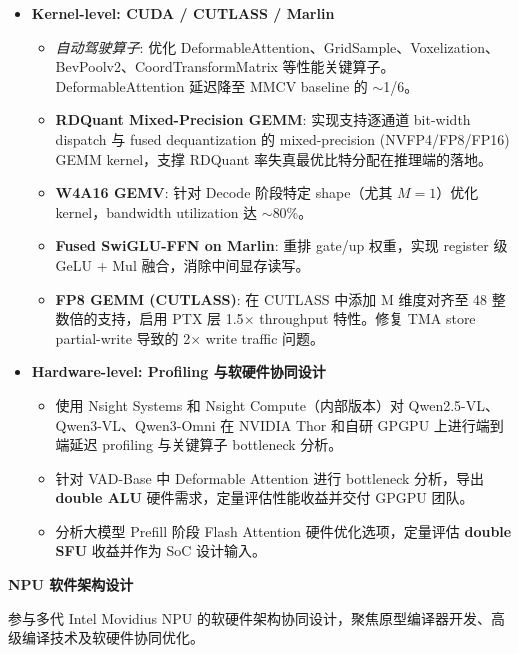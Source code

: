 \documentclass{resume_zh}
\begin{document}
\begin{itemize}
\item \textbf{Kernel-level: CUDA / CUTLASS / Marlin}
\begin{itemize}
  \item \textit{自动驾驶算子}: 优化 DeformableAttention、GridSample、Voxelization、BevPoolv2、CoordTransformMatrix 等性能关键算子。DeformableAttention 延迟降至 MMCV baseline 的 $\sim$1/6。
  \item \textbf{RDQuant Mixed-Precision GEMM}: 实现支持逐通道 bit-width dispatch 与 fused dequantization 的 mixed-precision (NVFP4/FP8/FP16) GEMM kernel，支撑 RDQuant 率失真最优比特分配在推理端的落地。
  \item \textbf{W4A16 GEMV}: 针对 Decode 阶段特定 shape（尤其 $M\!=\!1$）优化 kernel，bandwidth utilization 达 $\sim$80\%。
  \item \textbf{Fused SwiGLU-FFN on Marlin}: 重排 gate/up 权重，实现 register 级 GeLU + Mul 融合，消除中间显存读写。
  \item \textbf{FP8 GEMM (CUTLASS)}: 在 CUTLASS 中添加 M 维度对齐至 48 整数倍的支持，启用 PTX 层 1.5$\times$ throughput 特性。修复 TMA store partial-write 导致的 2$\times$ write traffic 问题。
\end{itemize}

\item \textbf{Hardware-level: Profiling 与软硬件协同设计}
\begin{itemize}
  \item 使用 Nsight Systems 和 Nsight Compute（内部版本）对 Qwen2.5-VL、Qwen3-VL、Qwen3-Omni 在 NVIDIA Thor 和自研 GPGPU 上进行端到端延迟 profiling 与关键算子 bottleneck 分析。
  \item 针对 VAD-Base 中 Deformable Attention 进行 bottleneck 分析，导出 \textbf{double ALU} 硬件需求，定量评估性能收益并交付 GPGPU 团队。
  \item 分析大模型 Prefill 阶段 Flash Attention 硬件优化选项，定量评估 \textbf{double SFU} 收益并作为 SoC 设计输入。
\end{itemize}

\end{itemize}

\textbf{NPU 软件架构设计}

参与多代 Intel Movidius NPU 的软硬件架构协同设计，聚焦原型编译器开发、高级编译技术及软硬件协同优化。
\end{document}
